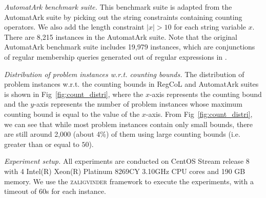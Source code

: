 \medskip
\noindent
\emph{AutomatArk benchmark suite.}
This benchmark suite is adapted from the AutomatArk suite \cite{z3str3re} by picking out the string constraints containing counting operators. We also add the length constraint $|x| > 10$ for each string variable $x$. There are 8,215 instances in the AutomatArk suite.
Note that the original AutomatArk benchmark suite \cite{z3str3re} includes 19,979 instances, which are conjunctions of regular membership queries generated out of regular expressions in \cite{automatark}.


\medskip
\noindent
\emph{Distribution of problem instances w.r.t. counting bounds. }
The distribution of problem instances w.r.t. the counting bounds in RegCoL and AutomatArk suites is shown in Fig~\ref{fig:count_distri}, where the $x$-axis represents the counting bound and the $y$-axis represents the number of problem instances whose maximum counting bound is equal to the value of the $x$-axis. 
From Fig~\ref{fig:count_distri}, we can see that while most problem instances contain only small bounds, there are still around 2,000  (about 4\%) of them using large counting bounds (i.e. greater than or equal to $50$).

\medskip
\noindent
\emph{Experiment setup.}
All experiments are conducted on CentOS Stream release 8 with 4 Intel(R) Xeon(R) Platinum 8269CY 3.10GHz CPU cores and 190 GB memory. We use the \textsc{zaligvinder} framework \cite{zaligvinder_2021} to execute the experiments, with a timeout of 60s for each instance.


